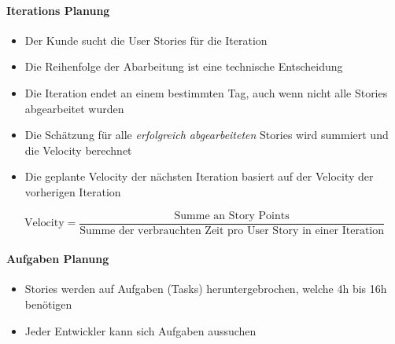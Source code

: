 \documentclass[ngerman,color=3b]{tuda_summary}
\begin{document}
\paragraph{Iterations Planung}
\begin{itemize}
    \item Der Kunde sucht die User Stories für die Iteration
    \item Die Reihenfolge der Abarbeitung ist eine technische Entscheidung
    \item Die Iteration endet an einem bestimmten Tag, auch wenn nicht alle Stories abgearbeitet wurden
    \item Die Schätzung für alle \textit{erfolgreich abgearbeiteten} Stories wird summiert und die Velocity berechnet
    \item Die geplante Velocity der nächsten Iteration basiert auf der Velocity der vorherigen Iteration
\end{itemize}

\begin{equation*}
    \text{Velocity} = \frac{\text{Summe an Story Points}}{\text{Summe der verbrauchten Zeit pro User Story in einer Iteration}}
\end{equation*}

\paragraph{Aufgaben Planung}
\begin{itemize}
    \item Stories werden auf Aufgaben (Tasks) heruntergebrochen, welche 4h bis 16h benötigen
    \item Jeder Entwickler kann sich Aufgaben aussuchen
\end{itemize}


\clearpage
\end{document}
